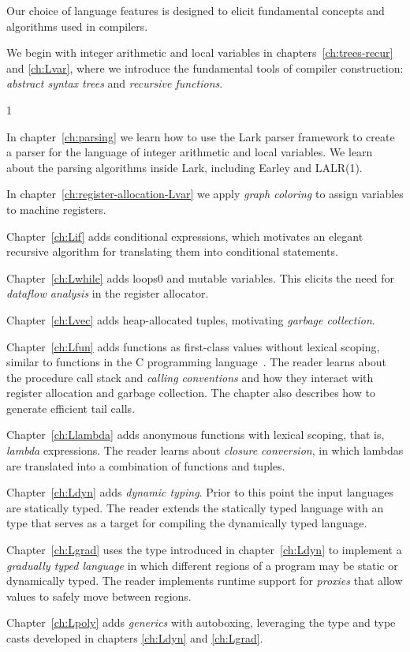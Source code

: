 \documentclass[7x10]{TimesAPriori_MIT}%
\def\racketEd{0}
\def\pythonEd{1}
\def\edition{1}
\newcommand{\racket}[1]{{\if\edition\racketEd{#1}\fi}}
\newcommand{\pythonColor}[0]{}
\numberwithin{theorem}{chapter}
\numberwithin{definition}{chapter}
\numberwithin{equation}{chapter}
\begin{document}
Our choice of language features is designed to elicit fundamental
concepts and algorithms used in compilers.
\begin{itemize}
\item We begin with integer arithmetic and local variables in
  chapters~\ref{ch:trees-recur} and \ref{ch:Lvar}, where we introduce
  the fundamental tools of compiler construction: \emph{abstract
    syntax trees} and \emph{recursive functions}. 
{\if\edition\pythonEd\pythonColor
\item In chapter~\ref{ch:parsing} we learn how to use the Lark
  parser framework to create a parser for the language of integer
  arithmetic and local variables. We learn about the parsing
  algorithms inside Lark, including Earley and LALR(1).
%
\fi}
\item In chapter~\ref{ch:register-allocation-Lvar} we apply
  \emph{graph coloring} to assign variables to machine registers.
\item Chapter~\ref{ch:Lif} adds conditional expressions, which
  motivates an elegant recursive algorithm for translating them into
  conditional  statements.
\item Chapter~\ref{ch:Lwhile} adds loops\racket{ and mutable
  variables}. This elicits the need for \emph{dataflow
    analysis} in the register allocator.
\item Chapter~\ref{ch:Lvec} adds heap-allocated tuples, motivating
  \emph{garbage collection}.
\item Chapter~\ref{ch:Lfun} adds functions as first-class values 
  without lexical scoping, similar to functions in the C programming
  language~\citep{Kernighan:1988nx}. The reader learns about the
  procedure call stack and \emph{calling conventions} and how they interact
  with register allocation and garbage collection. The chapter also
  describes how to generate efficient tail calls.
\item Chapter~\ref{ch:Llambda} adds anonymous functions with lexical
  scoping, that is, \emph{lambda} expressions. The reader learns about
  \emph{closure conversion}, in which lambdas are translated into a
  combination of functions and tuples.
\item Chapter~\ref{ch:Ldyn} adds \emph{dynamic typing}. Prior to this
  point the input languages are statically typed.  The reader extends
  the statically typed language with an  type that serves
  as a target for compiling the dynamically typed language.
\item Chapter~\ref{ch:Lgrad} uses the  type introduced in
  chapter~\ref{ch:Ldyn} to implement a \emph{gradually typed language}
  in which different regions of a program may be static or dynamically
  typed. The reader implements runtime support for \emph{proxies} that
  allow values to safely move between regions.
\item Chapter~\ref{ch:Lpoly} adds \emph{generics} with autoboxing,
  leveraging the  type and type casts developed in chapters
  \ref{ch:Ldyn} and \ref{ch:Lgrad}.
\end{itemize}
\end{document}
